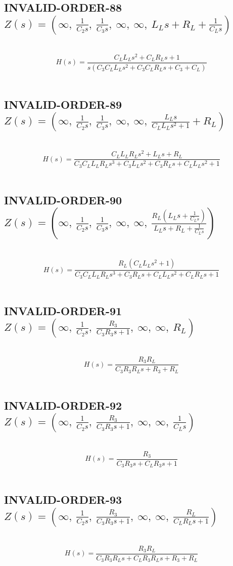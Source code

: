 \documentclass{article}
\begin{document}
\subsection{INVALID-ORDER-88 $Z(s) = \left( \infty, \  \frac{1}{C_{2} s}, \  \frac{1}{C_{3} s}, \  \infty, \  \infty, \  L_{L} s + R_{L} + \frac{1}{C_{L} s}\right)$ } \ 
\textbf{\[H(s) = \frac{C_{L} L_{L} s^{2} + C_{L} R_{L} s + 1}{s \left(C_{3} C_{L} L_{L} s^{2} + C_{3} C_{L} R_{L} s + C_{3} + C_{L}\right)}\] } \ 
\subsection{INVALID-ORDER-89 $Z(s) = \left( \infty, \  \frac{1}{C_{2} s}, \  \frac{1}{C_{3} s}, \  \infty, \  \infty, \  \frac{L_{L} s}{C_{L} L_{L} s^{2} + 1} + R_{L}\right)$ } \ 
\textbf{\[H(s) = \frac{C_{L} L_{L} R_{L} s^{2} + L_{L} s + R_{L}}{C_{3} C_{L} L_{L} R_{L} s^{3} + C_{3} L_{L} s^{2} + C_{3} R_{L} s + C_{L} L_{L} s^{2} + 1}\] } \ 
\subsection{INVALID-ORDER-90 $Z(s) = \left( \infty, \  \frac{1}{C_{2} s}, \  \frac{1}{C_{3} s}, \  \infty, \  \infty, \  \frac{R_{L} \left(L_{L} s + \frac{1}{C_{L} s}\right)}{L_{L} s + R_{L} + \frac{1}{C_{L} s}}\right)$ } \ 
\textbf{\[H(s) = \frac{R_{L} \left(C_{L} L_{L} s^{2} + 1\right)}{C_{3} C_{L} L_{L} R_{L} s^{3} + C_{3} R_{L} s + C_{L} L_{L} s^{2} + C_{L} R_{L} s + 1}\] } \ 
\subsection{INVALID-ORDER-91 $Z(s) = \left( \infty, \  \frac{1}{C_{2} s}, \  \frac{R_{3}}{C_{3} R_{3} s + 1}, \  \infty, \  \infty, \  R_{L}\right)$ } \ 
\textbf{\[H(s) = \frac{R_{3} R_{L}}{C_{3} R_{3} R_{L} s + R_{3} + R_{L}}\] } \ 
\subsection{INVALID-ORDER-92 $Z(s) = \left( \infty, \  \frac{1}{C_{2} s}, \  \frac{R_{3}}{C_{3} R_{3} s + 1}, \  \infty, \  \infty, \  \frac{1}{C_{L} s}\right)$ } \ 
\textbf{\[H(s) = \frac{R_{3}}{C_{3} R_{3} s + C_{L} R_{3} s + 1}\] } \ 
\subsection{INVALID-ORDER-93 $Z(s) = \left( \infty, \  \frac{1}{C_{2} s}, \  \frac{R_{3}}{C_{3} R_{3} s + 1}, \  \infty, \  \infty, \  \frac{R_{L}}{C_{L} R_{L} s + 1}\right)$ } \ 
\textbf{\[H(s) = \frac{R_{3} R_{L}}{C_{3} R_{3} R_{L} s + C_{L} R_{3} R_{L} s + R_{3} + R_{L}}\] } \ 
\end{document}
